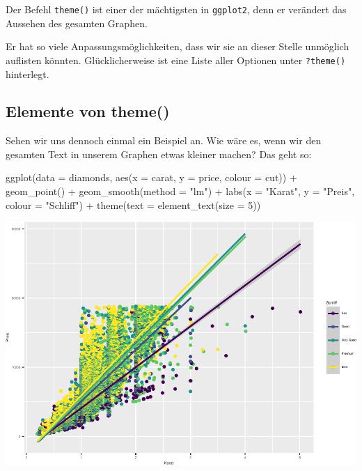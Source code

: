 \documentclass[
]{book}
\newenvironment{Shaded}{\begin{snugshade}}{\end{snugshade}}
\newcommand{\AttributeTok}[1]{\textcolor[rgb]{0.77,0.63,0.00}{#1}}
\newcommand{\DecValTok}[1]{\textcolor[rgb]{0.00,0.00,0.81}{#1}}
\newcommand{\FunctionTok}[1]{\textcolor[rgb]{0.00,0.00,0.00}{#1}}
\newcommand{\NormalTok}[1]{#1}
\newcommand{\SpecialCharTok}[1]{\textcolor[rgb]{0.00,0.00,0.00}{#1}}
\newcommand{\StringTok}[1]{\textcolor[rgb]{0.31,0.60,0.02}{#1}}
\begin{document}
Der Befehl \texttt{theme()} ist einer der mächtigsten in \texttt{ggplot2}, denn er verändert das Aussehen des gesamten Graphen.

Er hat so viele Anpassungsmöglichkeiten, dass wir sie an dieser Stelle unmöglich auflisten könnten. Glücklicherweise ist eine Liste aller Optionen unter \texttt{?theme()} hinterlegt.

\hypertarget{elemente-von-theme}{%
\subsection{Elemente von theme()}\label{elemente-von-theme}}

Sehen wir uns dennoch einmal ein Beispiel an. Wie wäre es, wenn wir den gesamten Text in unserem Graphen etwas kleiner machen? Das geht so:

\begin{Shaded}
\begin{Highlighting}[]
\FunctionTok{ggplot}\NormalTok{(}\AttributeTok{data =}\NormalTok{ diamonds, }\FunctionTok{aes}\NormalTok{(}\AttributeTok{x =}\NormalTok{ carat, }\AttributeTok{y =}\NormalTok{ price, }\AttributeTok{colour =}\NormalTok{ cut)) }\SpecialCharTok{+}
  \FunctionTok{geom\_point}\NormalTok{() }\SpecialCharTok{+}
  \FunctionTok{geom\_smooth}\NormalTok{(}\AttributeTok{method =} \StringTok{"lm"}\NormalTok{) }\SpecialCharTok{+}
  \FunctionTok{labs}\NormalTok{(}\AttributeTok{x =} \StringTok{"Karat"}\NormalTok{, }\AttributeTok{y =} \StringTok{"Preis"}\NormalTok{, }\AttributeTok{colour =} \StringTok{"Schliff"}\NormalTok{) }\SpecialCharTok{+}
  \FunctionTok{theme}\NormalTok{(}\AttributeTok{text =} \FunctionTok{element\_text}\NormalTok{(}\AttributeTok{size =} \DecValTok{5}\NormalTok{))}
\end{Highlighting}
\end{Shaded}

\includegraphics{CFH_R_bookdown_files/figure-latex/unnamed-chunk-178-1.pdf}
\end{document}
